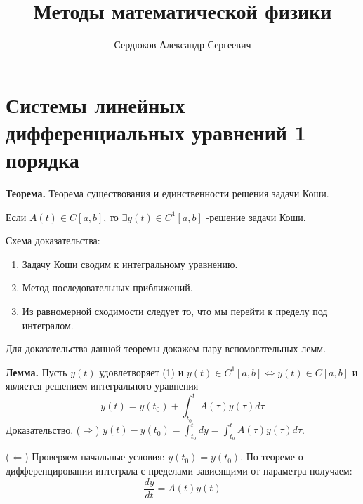 \documentclass[12pt]{article}
\newcommand{\equals}{\Leftrightarrow}
\newcommand{\thr}{{\bfseries Теорема. }}
\newcommand{\lem}{{\bfseries Лемма. }}
\begin{document}
	\title{Методы математической физики}
	\author{Сердюков Александр Сергеевич}
	\date{}
	\maketitle
	
	\section{Системы линейных дифференциальных уравнений 1 порядка}
	
	\thr Теорема существования и единственности решения задачи Коши.
	
	Если $A(t) \in C[a,b]$, то $\exists y(t) \in C^1[a,b] $ -решение задачи Коши.
	
	Схема доказательства:
	\begin{enumerate}
		\item Задачу Коши сводим к интегральному уравнению.
		\item Метод последовательных приближений.
		\item Из равномерной сходимости следует то, что мы перейти к пределу под интегралом.
	\end{enumerate}
	
	Для доказательства данной теоремы докажем пару вспомогательных лемм.
	
	\lem Пусть $y(t)$ удовлетворяет (1) и $y(t) \in C^1[a,b] \equals y(t) \in C[a,b]$ и является решением интегрального уравнения 
	$$ y(t) = y(t_0) + \int_{t_0}^t A(\tau)y(\tau)d\tau$$
	Доказательство. 
	($\Rightarrow$) $y(t) - y(t_0) = \int_{t_0}^t dy= \int_{t_0}^t A(\tau)y(\tau)d\tau$. 
	
	($\Leftarrow$) Проверяем начальные условия: $y(t_0) = y(t_0)$. По теореме о дифференцировании интеграла с пределами зависящими от параметра получаем:
	$$\frac{dy}{dt} = A(t)y(t)$$
	\raggedleft{ $\Box $}
	
	\raggedright
		
	 
\end{document}
